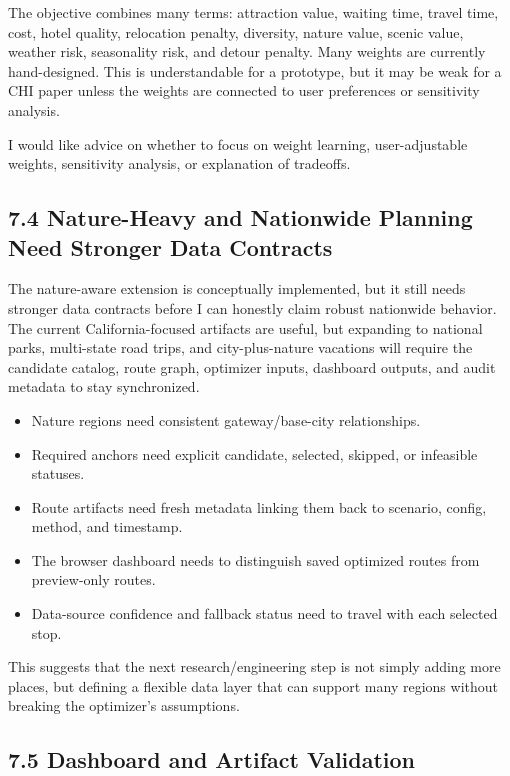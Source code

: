 \documentclass[11pt,a4paper]{article}
\begin{document}
\noindent The objective combines many terms: attraction value, waiting time, travel time, cost, hotel quality, relocation penalty, diversity, nature value, scenic value, weather risk, seasonality risk, and detour penalty. Many weights are currently hand-designed. This is understandable for a prototype, but it may be weak for a CHI paper unless the weights are connected to user preferences or sensitivity analysis.

\vspace{0.5em}
\noindent I would like advice on whether to focus on weight learning, user-adjustable weights, sensitivity analysis, or explanation of tradeoffs.

\subsection*{7.4 Nature-Heavy and Nationwide Planning Need Stronger Data Contracts}

\noindent The nature-aware extension is conceptually implemented, but it still needs stronger data contracts before I can honestly claim robust nationwide behavior. The current California-focused artifacts are useful, but expanding to national parks, multi-state road trips, and city-plus-nature vacations will require the candidate catalog, route graph, optimizer inputs, dashboard outputs, and audit metadata to stay synchronized.

\begin{itemize}
    \item Nature regions need consistent gateway/base-city relationships.
    \item Required anchors need explicit candidate, selected, skipped, or infeasible statuses.
    \item Route artifacts need fresh metadata linking them back to scenario, config, method, and timestamp.
    \item The browser dashboard needs to distinguish saved optimized routes from preview-only routes.
    \item Data-source confidence and fallback status need to travel with each selected stop.
\end{itemize}

\noindent This suggests that the next research/engineering step is not simply adding more places, but defining a flexible data layer that can support many regions without breaking the optimizer's assumptions.

\subsection*{7.5 Dashboard and Artifact Validation}
\end{document}
